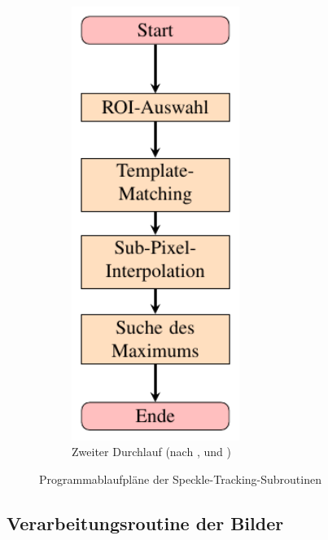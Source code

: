\begin{figure}[htbp]
\begin{subfigure}[b]{0.3\textwidth}
		\includegraphics[width=0.6\textwidth]{pdf/graph_second_pass}
		\caption[Zweiter Durchlauf]{Zweiter Durchlauf (nach , \cite{Ber12} und \cite{Kov04})}
		\label{fig:graph_second}
	\end{subfigure}
	\caption[Algorithmen]{Programmablaufpläne der Speckle-Tracking-Subroutinen}
\end{figure}

\subsection{Verarbeitungsroutine der Bilder}

